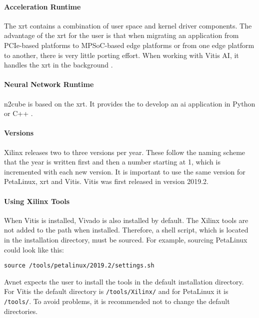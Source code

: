\paragraph{Acceleration Runtime}
The \acrfull{xrt} contains a combination of user space and kernel driver components.
The advantage of the \acrshort{xrt} for the user is that when migrating an application from PCIe-based platforms to MPSoC-based edge platforms or from one edge platform to another, there is very little porting effort.
When working with Vitis AI, it handles the \acrshort{xrt} in the background \cite{xrt_overview}.

\paragraph{Neural Network Runtime}
\acrshort{n2cube} is based on the \acrshort{xrt}.
It provides the  to develop an \acrshort{ai} application in Python or C++ \cite{vitis_ai_user_guide}.

\paragraph{Versions}
Xilinx releases two to three versions per year.
These follow the naming scheme that the year is written first and then a number starting at 1, which is incremented with each new version.
It is important to use the same version for PetaLinux, \acrshort{xrt} and Vitis.
Vitis was first released in version 2019.2.

\paragraph{Using Xilinx Tools}
When Vitis is installed, Vivado is also installed by default.
The Xilinx tools are not added to the path when installed.
Therefore, a shell script, which is located in the installation directory, must be sourced.
For example, sourcing PetaLinux could look like this:
\begin{lstlisting}[style=bash, caption={}, label=lst:source_tools]
  source /tools/petalinux/2019.2/settings.sh
\end{lstlisting}
Avnet expects the user to install the tools in the default installation directory.
For Vitis the default directory is \texttt{/tools/Xilinx/} and for PetaLinux it is \texttt{/tools/}.
To avoid problems, it is recommended not to change the default directories.
